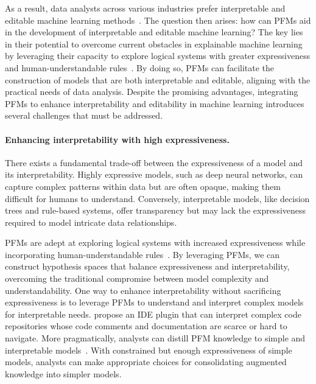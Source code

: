 As a result, data analysts across various industries prefer interpretable and editable machine learning methods~\cite{vertsel2024hybrid,gerussi2022llm,Zhang2024LargeLM,truhn2023large}. The question then arises: how can PFMs aid in the development of interpretable and editable machine learning? The key lies in their potential to overcome current obstacles in explainable machine learning by leveraging their capacity to explore logical systems with greater expressiveness and human-understandable rules~\cite{reizingerposition}. By doing so, PFMs can facilitate the construction of models that are both interpretable and editable, aligning with the practical needs of data analysis. Despite the promising advantages, integrating PFMs to enhance interpretability and editability in machine learning introduces several challenges that must be addressed.

\paragraph{Enhancing interpretability with high expressiveness.}

There exists a fundamental trade-off between the expressiveness of a model and its interpretability. Highly expressive models, such as deep neural networks, can capture complex patterns within data but are often opaque, making them difficult for humans to understand. Conversely, interpretable models, like decision trees and rule-based systems, offer transparency but may lack the expressiveness required to model intricate data relationships.

PFMs are adept at exploring logical systems with increased expressiveness while incorporating human-under\-standable rules~\cite{reizingerposition}. By leveraging PFMs, we can construct hypothesis spaces that balance expressiveness and interpretability, overcoming the traditional compromise between model complexity and understandability. One way to enhance interpretability without sacrificing expressiveness is to leverage PFMs to understand and interpret complex models for interpretable needs. \cite{nam2024using} propose an IDE plugin that can interpret complex code repositories whose code comments and documentation are scarce or hard to navigate. More pragmatically, analysts can distill PFM knowledge to simple and interpretable models~\cite{singh2023augmenting}. With constrained but enough expressiveness of simple models, analysts can make appropriate choices for consolidating augmented knowledge into simpler models.


